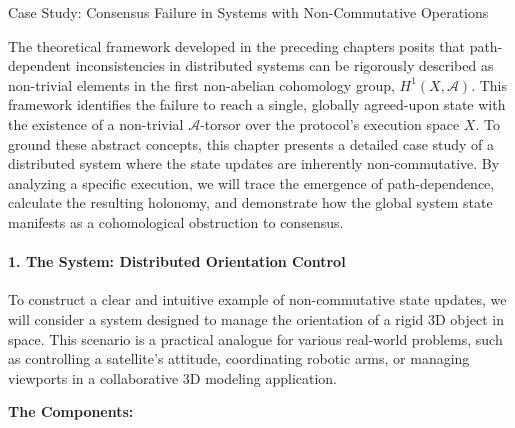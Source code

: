 \documentclass[
]{article}
\begin{document}
\protect{}\label{chapter-3-5-Case_Study__Consensus_Failure_in_Systems}{}

Case Study: Consensus Failure in Systems with Non-Commutative Operations

The theoretical framework developed in the preceding chapters posits
that path-dependent inconsistencies in distributed systems can be
rigorously described as non-trivial elements in the first non-abelian
cohomology group, \(H^1(X, \mathcal{A})\). This framework identifies the
failure to reach a single, globally agreed-upon state with the existence
of a non-trivial \(\mathcal{A}\)-torsor over the protocol's execution
space \(X\). To ground these abstract concepts, this chapter presents a
detailed case study of a distributed system where the state updates are
inherently non-commutative. By analyzing a specific execution, we will
trace the emergence of path-dependence, calculate the resulting
holonomy, and demonstrate how the global system state manifests as a
cohomological obstruction to consensus.

\paragraph{1. The System: Distributed Orientation
Control}\label{the-system-distributed-orientation-control}

To construct a clear and intuitive example of non-commutative state
updates, we will consider a system designed to manage the orientation of
a rigid 3D object in space. This scenario is a practical analogue for
various real-world problems, such as controlling a satellite's attitude,
coordinating robotic arms, or managing viewports in a collaborative 3D
modeling application.

\textbf{The Components:}
\end{document}
